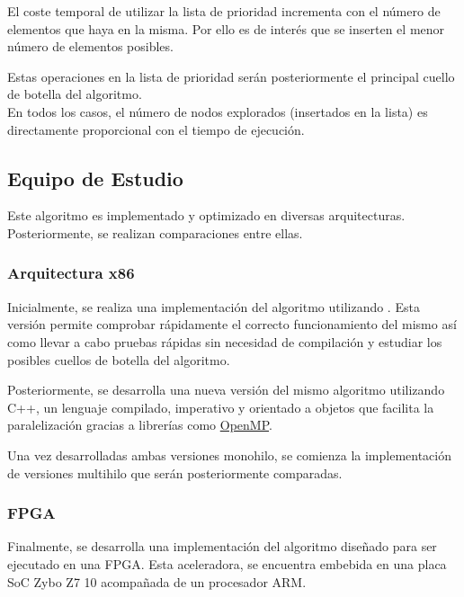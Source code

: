 \begin{keynotebox}
    El coste temporal de utilizar la lista de prioridad
    incrementa con el número de elementos que haya en la misma.
    Por ello es de interés que se inserten el menor número de elementos posibles.

    Estas operaciones en la lista de prioridad serán posteriormente
    el principal cuello de botella del algoritmo.\\

    En todos los casos, el número de nodos explorados 
    (insertados en la lista)
    es directamente proporcional
    con el tiempo de ejecución.
\end{keynotebox}

\pagebreak

\subsection{Equipo de Estudio}

Este algoritmo es implementado y optimizado en diversas arquitecturas.
Posteriormente, se realizan comparaciones entre ellas.

\subsubsection{Arquitectura x86}

Inicialmente, se realiza una implementación del algoritmo utilizando \Python{}.
Esta versión permite comprobar rápidamente el correcto funcionamiento del mismo
así como llevar a cabo pruebas rápidas sin necesidad de compilación y
estudiar los posibles cuellos de botella del algoritmo.

Posteriormente, se desarrolla una nueva versión del mismo algoritmo
utilizando C++, un lenguaje compilado, imperativo y orientado a objetos
que facilita la paralelización gracias a librerías como 
\href{https://www.openmp.org/}{OpenMP}\@.

Una vez desarrolladas ambas versiones monohilo,
se comienza la implementación de versiones multihilo
que serán posteriormente comparadas.

\subsubsection{FPGA}

Finalmente, se desarrolla una implementación del algoritmo
diseñado para ser ejecutado en una FPGA\@.
Esta aceleradora, se encuentra embebida en una placa SoC
Zybo Z7 10 acompañada de un procesador ARM\@.

